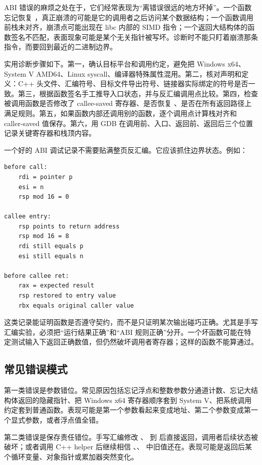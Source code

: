 ABI 错误的麻烦之处在于，它们经常表现为“离错误很远的地方坏掉”。一个函数忘记恢复 ，真正崩溃的可能是它的调用者之后访问某个数据结构；一个函数调用前栈未对齐，崩溃点可能出现在 libc 内部的 SIMD 指令；一个返回大结构体的函数签名不匹配，表面现象可能是某个无关指针被写坏。诊断时不能只盯着崩溃那条指令，而要回到最近的二进制边界。

实用诊断步骤如下。第一，确认目标平台和调用约定，避免把 Windows x64、System V AMD64、Linux syscall、编译器特殊属性混用。第二，核对声明和定义：C++ 头文件、汇编符号、目标文件导出符号、链接器实际绑定的符号是否一致。第三，根据函数签名手工推导入口状态，并与反汇编调用点比较。第四，检查被调用函数是否修改了 callee-saved 寄存器、是否恢复 、是否在所有返回路径上满足规则。第五，如果函数内部还调用别的函数，逐个调用点计算栈对齐和 caller-saved 值保存。第六，用 GDB 在调用前、入口、返回前、返回后三个位置记录关键寄存器和栈顶内容。

一个好的 ABI 调试记录不需要贴满整页反汇编。它应该抓住边界状态。例如：

\begin{lstlisting}
before call:
    rdi = pointer p
    esi = n
    rsp mod 16 = 0

callee entry:
    rsp points to return address
    rsp mod 16 = 8
    rdi still equals p
    esi still equals n

before callee ret:
    rax = expected result
    rsp restored to entry value
    rbx equals original caller value
\end{lstlisting}

这类记录能证明函数是否遵守契约，而不是只证明某次输出碰巧正确。尤其是手写汇编实验，必须把“运行结果正确”和“ABI 规则正确”分开。一个坏函数可能在特定测试输入下返回正确数值，但仍然破坏调用者寄存器；这样的函数不能算通过。

\subsection{常见错误模式}

第一类错误是参数错位。常见原因包括忘记浮点和整数参数分通道计数、忘记大结构体返回的隐藏指针、把 Windows x64 寄存器顺序套到 System V、把系统调用约定套到普通函数。表现可能是第一个参数看起来变成地址、第二个参数变成第一个显式参数，或者浮点值全错。

第二类错误是保存责任错位。手写汇编修改 、 到  后直接返回，调用者后续状态被破坏；或者调用 C++ helper 后继续相信 、、 中旧值还在。表现可能是返回后某个循环变量、对象指针或累加器突然变化。

